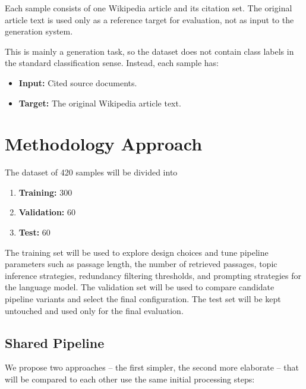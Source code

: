 \documentclass[10pt,a4paper]{article}
\begin{document}
Each sample consists of one Wikipedia article and its citation set. The original article text is used only as a reference target for evaluation, not as input to the generation system.

This is mainly a generation task, so the dataset does not contain class labels in the standard classification sense. Instead, each sample has:
\begin{itemize}
    \item \textbf{Input:} Cited source documents.
    \item \textbf{Target:} The original Wikipedia article text.
\end{itemize}

\section{Methodology Approach}

The dataset of 420 samples will be divided into
\begin{enumerate}
    \item \textbf{Training:} 300
    \item \textbf{Validation:} 60
    \item \textbf{Test:} 60
\end{enumerate}

The training set will be used to explore design choices and tune pipeline parameters such as passage length, the number of retrieved passages, topic inference strategies, redundancy filtering thresholds, and prompting strategies for the language model. The validation set will be used to compare candidate pipeline variants and select the final configuration. The test set will be kept untouched and used only for the final evaluation.

\subsection*{Shared Pipeline}

We propose two approaches -- the first simpler, the second more elaborate -- that will be compared to each other use the same initial processing steps:
\end{document}
